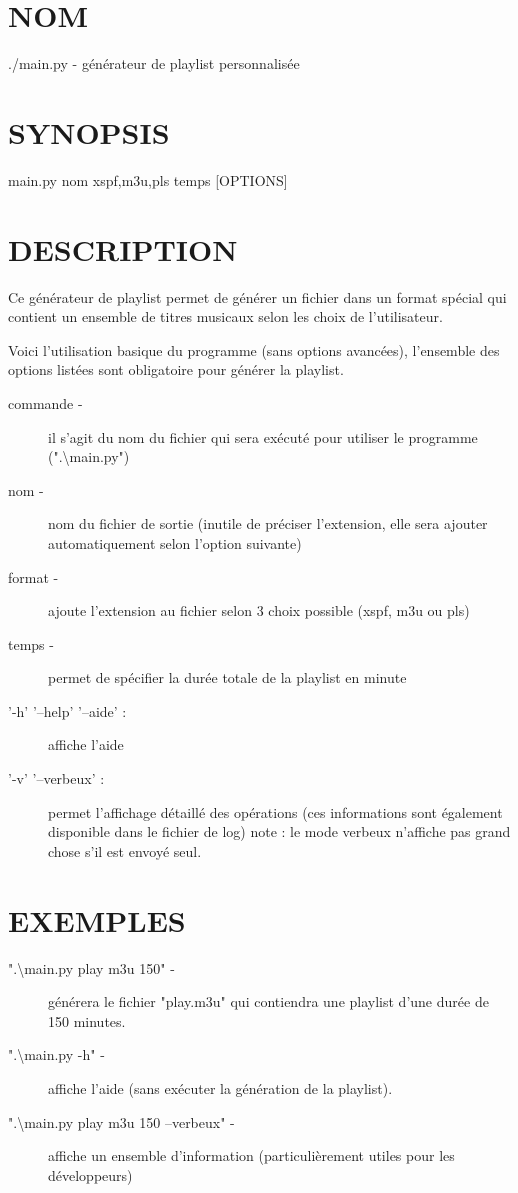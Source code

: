 \documentclass[a4paper,notitlepage,11pt]{article}
\begin{document}
\section{NOM}
./main.py - générateur de playlist personnalisée

\section{SYNOPSIS}
main.py nom {xspf,m3u,pls} temps [OPTIONS]

\section{DESCRIPTION}
Ce générateur de playlist permet de générer un fichier dans un format spécial qui contient un ensemble de titres musicaux selon les choix de l'utilisateur.

Voici l'utilisation basique du programme (sans options avancées), l'ensemble des options listées sont obligatoire pour générer la playlist.
\begin{description}
\item[commande -] il s'agit du nom du fichier qui sera exécuté pour utiliser le programme (".\textbackslash{}main.py")
\item[nom -] nom du fichier de sortie (inutile de préciser l'extension, elle sera ajouter automatiquement selon l'option suivante)
\item[format -] ajoute l'extension au fichier selon 3 choix possible (xspf, m3u ou pls)
\item[temps -] permet de spécifier la durée totale de la playlist en minute
\item['-h' '--help' '--aide' :] affiche l'aide
\item['-v' '--verbeux' :] permet l'affichage détaillé des opérations (ces informations sont également disponible dans le fichier de log)
note : le mode verbeux n'affiche pas grand chose s'il est envoyé seul.
\end{description}

\section{EXEMPLES}
\begin{description}
\item[".\textbackslash{}main.py play m3u 150" -] générera le fichier "play.m3u" qui contiendra une playlist d'une durée de 150 minutes.
\item[".\textbackslash{}main.py -h" -] affiche l'aide (sans exécuter la génération de la playlist).
\item[".\textbackslash{}main.py play m3u 150 --verbeux" -] affiche un ensemble d'information (particulièrement utiles pour les développeurs)
\end{description}
\end{document}
